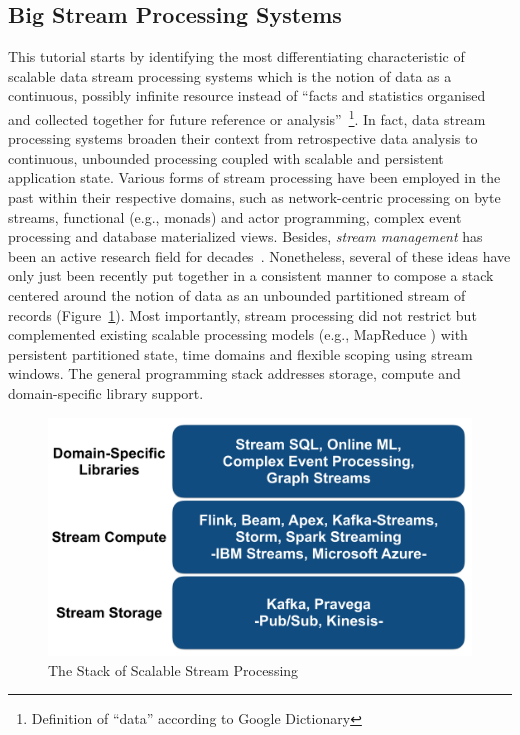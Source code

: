 
\subsection{Big Stream Processing Systems}
\label{sec:tut_systems}

This tutorial starts by identifying the most differentiating characteristic of scalable data stream processing systems which is the notion of data as a continuous, possibly infinite resource instead of ``facts and statistics organised and collected together for future reference or analysis''~\footnote{Definition of ``data'' according to Google Dictionary}. In fact, data stream processing systems broaden their context from retrospective data analysis to continuous, unbounded processing coupled with scalable and persistent application state.  Various forms of stream processing have been employed in the past within their respective domains, such as network-centric processing on byte streams, functional (e.g., monads) and actor programming, complex event processing and database materialized views. Besides, \emph{stream management} has been an active research field for decades~\cite{abadi2003aurora,arasu2004stream,chandrasekaran2003telegraphcq}. Nonetheless, several of these ideas have  only just been recently put together in a consistent manner to compose a stack  centered around the notion of data as an unbounded partitioned stream of records (Figure~\ref{fig:streamstack}). Most importantly, stream processing did not restrict but complemented existing scalable processing models (e.g., MapReduce \cite{dean2008mapreduce}) with persistent partitioned state, time domains and flexible scoping using stream windows. The general programming stack  addresses storage, compute and domain-specific library support.

\begin{figure}[t]
\centering
\includegraphics[width=0.4 \textwidth]{pictures/streamstack.pdf}
\caption{The Stack of Scalable Stream Processing}
\label{fig:streamstack}
\end{figure}

